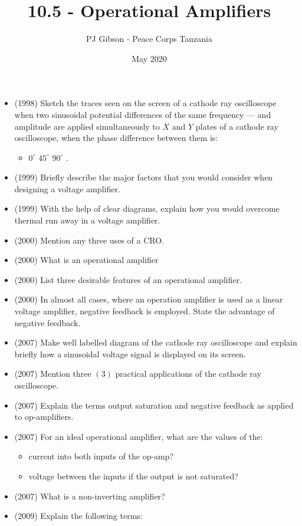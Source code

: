 \documentclass{article}
\title{\textbf{10.5 - Operational Amplifiers}}
\author{PJ Gibson - Peace Corps Tanzania}
\date{May 2020}
\begin{document}
\maketitle

\begin{itemize}
\item (1998)  Sketch the traces seen on the screen of a cathode ray oscilloscope when two sinusoidal potential differences of the same frequency — and amplitude are applied simultaneously to $ X$ and $ Y$ plates of  a cathode ray oscilloscope, when the phase difference between them is:
 \begin{itemize}
\item $ 0^{\circ}$ $ 45^{\circ}$ $ 90^{\circ}$ .
\end{itemize}
\item (1999)  Briefly describe the major factors that you would consider when designing a voltage amplifier.
\item (1999)  With the help of clear diagrams, explain how you would overcome thermal run away in a voltage amplifier.
\item (2000)  Mention any three uses of a CRO.
\item (2000)  What is an operational amplifier 
\item (2000)  List three desirable features of an operational amplifier.
\item (2000)  In almost all cases, where an operation amplifier is used as a linear voltage amplifier, negative feedback is employed. State the advantage of negative feedback.
\item (2007)  Make well labelled diagram of the cathode ray oscilloscope and explain briefly how a sinusoidal voltage signal is displayed on its screen.
\item (2007)  Mention three $ (3)$ practical applications of the cathode ray oscilloscope.
\item (2007)  Explain the terms output saturation and negative feedback as applied to op-amplifiers. 
\item (2007)  For an ideal operational amplifier, what are the values of the:
 \begin{itemize}
\item current into both inputs of the op-amp? 
\item voltage between the inputs if the output is not saturated? 
\end{itemize}
\item (2007)  What is a non-inverting amplifier? 
\item (2009)  Explain the following terms:

\end{itemize}
\end{document}
